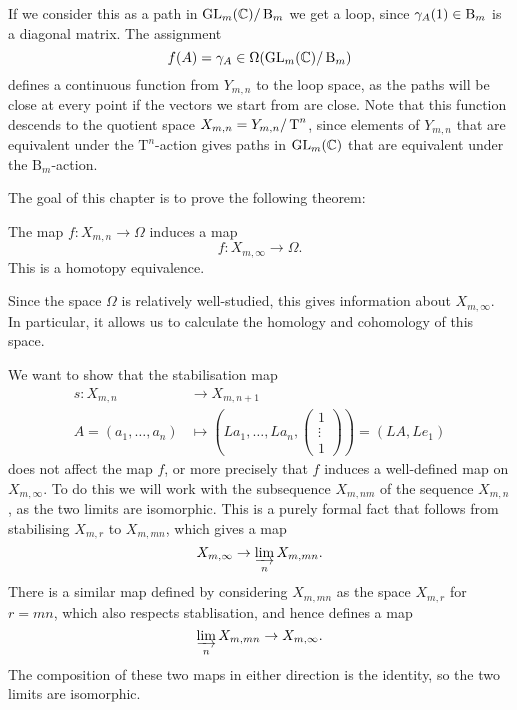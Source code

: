 If we consider this as a path in $\operatorname{GL}_{m}(\mathbb{C})/\operatorname{B}_{m}$ we
get a loop, since $\gamma_A(1)\in\operatorname{B}_m$ is a diagonal matrix. The
assignment
\[ f(A) = \gamma_A \in \Omega(\operatorname{GL}_{m}(\mathbb{C})/\operatorname{B}_{m}) \]
defines a continuous function from $Y_{m,n}$ to the loop space, as the
paths will be close at every point if the vectors we start from are
close. Note that
this function descends to the quotient space $X_{m,n}=Y_{m,n}/\operatorname{T}^n$, since
elements of $Y_{m,n}$ that are equivalent under the
$\mathrm{T}^n$-action gives
paths in $\operatorname{GL}_m(\mathbb{C})$ that are equivalent under the $\mathrm{B}_m$-action.

The goal of this chapter is to prove the following theorem:

\begin{theorem}
  The map $f : X_{m,n} \to \Omega$ induces a map
  \[ f : X_{m,\infty} \to \Omega. \]
  This is a homotopy equivalence.
\end{theorem}

Since the space $\Omega$ is relatively well-studied, this gives
information about $X_{m,\infty}$. In particular, it allows us to
calculate the homology and cohomology of this space.

We want to show that the stabilisation map
\begin{align*}
  s : X_{m,n} &\to X_{m,n+1} \\
  A = (a_1,\dots,a_n) &\mapsto \left(La_1,\dots,La_n,
    \begin{pmatrix}
      1 \\
      \vdots\\
      1
    \end{pmatrix} 
\right) = (LA,Le_1) 
\end{align*}
does not affect the map $f$, or more precisely that $f$ induces a
well-defined map on $X_{m,\infty}$. To do this we will work with the
subsequence $X_{m,nm}$ of the sequence $X_{m,n}$, as the two limits
are isomorphic. This is a purely formal fact that follows from
stabilising $X_{m,r}$ to $X_{m,mn}$, which gives a map
\[ X_{m,\infty} \to  \varinjlim_{n} X_{m,mn}. \]
There is a similar map defined by considering $X_{m,mn}$ as the space
$X_{m,r}$ for $r = mn$, which also respects stablisation, and hence
defines a map
\[ \varinjlim_n X_{m,mn} \to X_{m,\infty}. \]
The composition of these two maps in either direction is the identity,
so the two limits are isomorphic.

